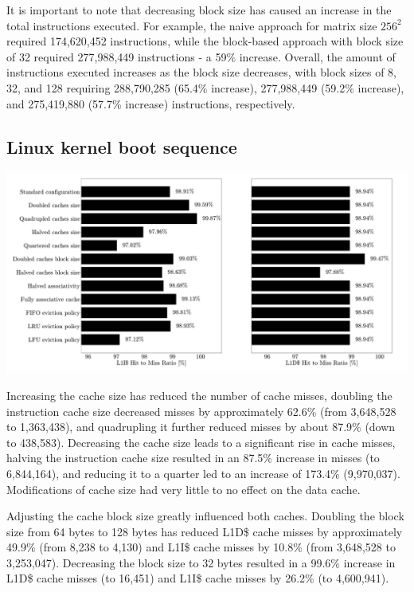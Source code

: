 \noindent It is important to note that decreasing block size has caused an increase in the total instructions executed. For example, the naive approach for matrix size \( 256^2 \) required
174,620,452 instructions, while the block-based approach with block size of 32 required 277,988,449 instructions - a 59\% increase. Overall, the amount of instructions executed
increases as the block size decreases, with block sizes of 8, 32, and 128 requiring 288,790,285 (65.4\% increase), 277,988,449 (59.2\% increase), and 275,419,880 (57.7\% increase)
instructions, respectively.

\subsection*{Linux kernel boot sequence} \label{sec:conc_linux}

\begin{center}
	\centering
	\includegraphics[width=1\textwidth]{figures/05-analysis/linux_boot.pdf}
\end{center}

Increasing the cache size has reduced the number of cache misses, doubling the instruction cache size decreased misses by approximately 62.6\% (from 3,648,528 to 1,363,438), and
quadrupling it further reduced misses by about 87.9\% (down to 438,583). Decreasing the cache size leads to a significant rise in cache misses, halving the instruction cache size
resulted in an 87.5\% increase in misses (to 6,844,164), and reducing it to a quarter led to an increase of 173.4\% (9,970,037). Modifications of cache size had very little to no
effect on the data cache.

Adjusting the cache block size greatly influenced both caches. Doubling the block size from 64 bytes to 128 bytes has reduced L1D\$ cache misses by approximately 49.9\% (from 8,238
to 4,130) and L1I\$ cache misses by 10.8\% (from 3,648,528 to 3,253,047). Decreasing the block size to 32 bytes resulted in a 99.6\% increase in L1D\$ cache misses (to 16,451) and
L1I\$ cache misses by 26.2\% (to 4,600,941).

